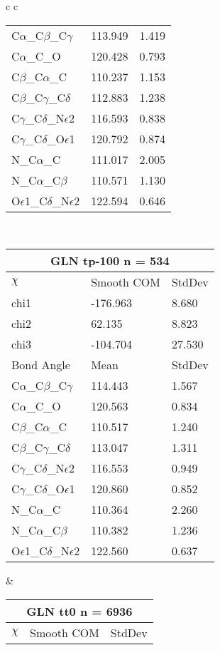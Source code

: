 \begin{longtable}{ c c }
\begin{tabular}{ l l l }
  C$\alpha$\_C$\beta$\_C$\gamma$ & 113.949 & 1.419\\
  C$\alpha$\_C\_O & 120.428 & 0.793\\
  C$\beta$\_C$\alpha$\_C & 110.237 & 1.153\\
  C$\beta$\_C$\gamma$\_C$\delta$ & 112.883 & 1.238\\
  C$\gamma$\_C$\delta$\_N$\epsilon$2 & 116.593 & 0.838\\
  C$\gamma$\_C$\delta$\_O$\epsilon$1 & 120.792 & 0.874\\
  N\_C$\alpha$\_C & 111.017 & 2.005\\
  N\_C$\alpha$\_C$\beta$ & 110.571 & 1.130\\
  O$\epsilon$1\_C$\delta$\_N$\epsilon$2 & 122.594 & 0.646\\
  \bottomrule
  \end{tabular}
  \\
  \begin{tabular}{ l l l }
  \toprule
  \multicolumn{3}{c}{GLN \textbf{tp-100} n = 534} \\ \toprule
  $\chi$       & Smooth COM & StdDev \\ \midrule
  chi1 & -176.963 & 8.680 \\ 
  chi2 & 62.135 & 8.823 \\ 
  chi3 & -104.704 & 27.530 \\ \midrule
  Bond Angle   & Mean     & StdDev \\ \midrule
  C$\alpha$\_C$\beta$\_C$\gamma$ & 114.443 & 1.567\\
  C$\alpha$\_C\_O & 120.563 & 0.834\\
  C$\beta$\_C$\alpha$\_C & 110.517 & 1.240\\
  C$\beta$\_C$\gamma$\_C$\delta$ & 113.047 & 1.311\\
  C$\gamma$\_C$\delta$\_N$\epsilon$2 & 116.553 & 0.949\\
  C$\gamma$\_C$\delta$\_O$\epsilon$1 & 120.860 & 0.852\\
  N\_C$\alpha$\_C & 110.364 & 2.260\\
  N\_C$\alpha$\_C$\beta$ & 110.382 & 1.236\\
  O$\epsilon$1\_C$\delta$\_N$\epsilon$2 & 122.560 & 0.637\\
  \bottomrule
  \end{tabular}
  &
  \begin{tabular}{ l l l }
  \toprule
  \multicolumn{3}{c}{GLN \textbf{tt0} n = 6936} \\ \toprule
  $\chi$       & Smooth COM & StdDev \\ \midrule

\end{tabular}
\end{longtable}
